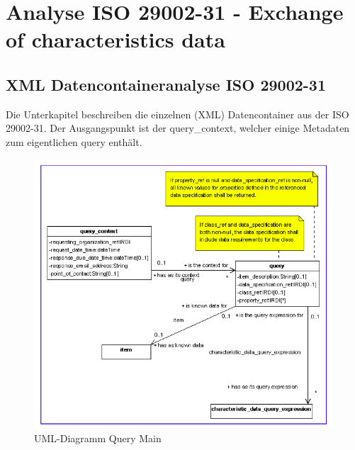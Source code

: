 \section{Analyse ISO 29002-31 - Exchange of characteristics data}



\subsection{XML Datencontaineranalyse ISO 29002-31}
Die Unterkapitel beschreiben die einzelnen (XML) Datencontainer aus der ISO 29002-31. Der Ausgangspunkt ist der query\_context, welcher einige Metadaten zum eigentlichen query enthält. 

\begin{figure}[htbp]
	\centering
		\includegraphics[width=0.99\textwidth]{images/query_main.png}
		\caption[UML-Diagramm Query Main]{UML-Diagramm Query Main\footnotemark}
	\label{fig:querymain}
\end{figure}

